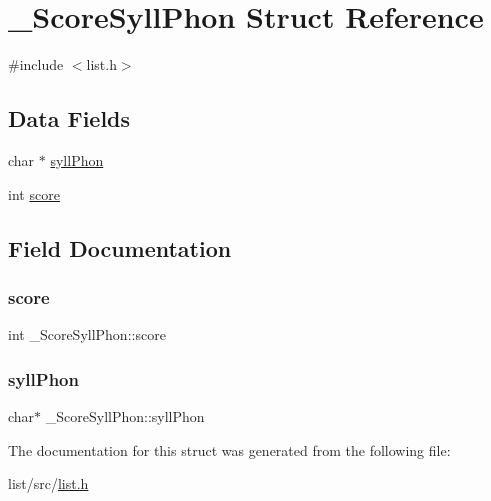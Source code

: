 \hypertarget{struct__ScoreSyllPhon}{}\section{\+\_\+\+Score\+Syll\+Phon Struct Reference}
\label{struct__ScoreSyllPhon}


{\ttfamily \#include $<$list.\+h$>$}

\subsection*{Data Fields}
\begin{DoxyCompactItemize}
\item 
char $\ast$ \mbox{\hyperlink{struct__ScoreSyllPhon_ae559395e6a1d1d381ede53015b3c8c6d}{syll\+Phon}}
\item 
int \mbox{\hyperlink{struct__ScoreSyllPhon_aeb8fd7a2eea4dd089105f875923fc034}{score}}
\end{DoxyCompactItemize}


\subsection{Field Documentation}
\mbox{\label{struct__ScoreSyllPhon_aeb8fd7a2eea4dd089105f875923fc034}} 
\subsubsection{\texorpdfstring{score}{score}}
{\footnotesize\ttfamily int \+\_\+\+Score\+Syll\+Phon\+::score}

\mbox{\label{struct__ScoreSyllPhon_ae559395e6a1d1d381ede53015b3c8c6d}} 
\subsubsection{\texorpdfstring{syll\+Phon}{syllPhon}}
{\footnotesize\ttfamily char$\ast$ \+\_\+\+Score\+Syll\+Phon\+::syll\+Phon}



The documentation for this struct was generated from the following file\+:\begin{DoxyCompactItemize}
\item 
list/src/\mbox{\hyperlink{list_8h}{list.\+h}}\end{DoxyCompactItemize}
